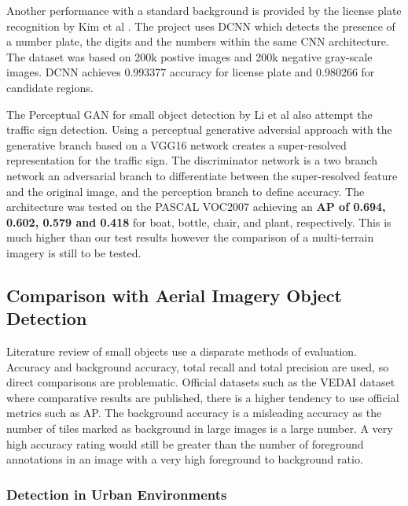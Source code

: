 \documentclass{IEEEtran}
\begin{document}
Another performance with a standard background is provided by the license plate recognition by Kim et al \cite{Kim2017}. The project uses DCNN which detects the presence of a number plate, the digits and the numbers within the same CNN architecture. The dataset was based on 200k postive images and 200k negative gray-scale images. DCNN achieves 0.993377 accuracy for license plate and 0.980266 for candidate regions. \newline

The Perceptual GAN for small object detection by Li et al \cite{Li2017} also attempt the traffic sign detection. Using a perceptual generative adversial approach with the generative branch based on a VGG16 network creates a super-resolved representation for the traffic sign. The discriminator network is a two branch network an adversarial branch to differentiate between the super-resolved feature and the original image, and the perception branch  to define accuracy. The architecture was tested on the PASCAL VOC2007 achieving an \textbf{AP of 0.694, 0.602, 0.579 and 0.418 } for boat, bottle, chair, and plant, respectively. This is much higher than our test results however the comparison of a multi-terrain imagery is still to be tested.\newline



\subsection{Comparison with Aerial Imagery Object Detection}

Literature review of small objects use a disparate methods of evaluation. Accuracy and background accuracy, total recall and total precision are used, so direct comparisons are problematic. Official datasets such as the VEDAI dataset \cite{razakarivony2016vehicle} where comparative results are published, there is a higher tendency to use official metrics such as AP. The background accuracy is a misleading accuracy as the number of tiles marked as background in large images is a large number. A very high accuracy rating would still be greater than the number of foreground annotations in an image with a very high foreground to background ratio.\newline

\subsubsection{Detection in Urban Environments}
\end{document}
